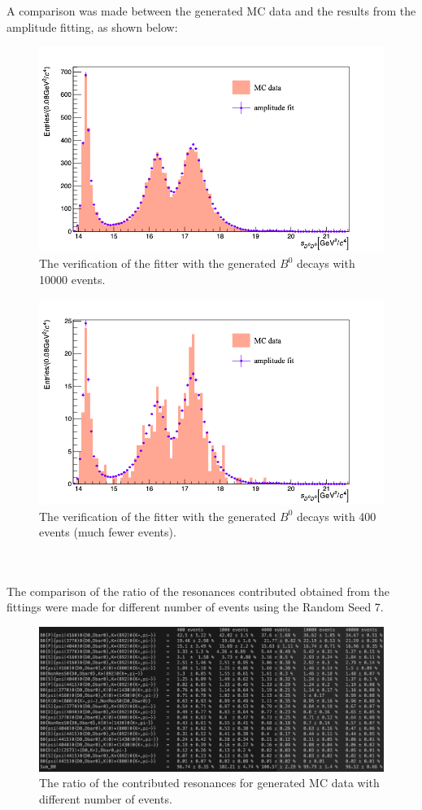 \\
\\
A comparison was made between the generated MC data and the results from the amplitude fitting, as shown  below:
\begin{figure}[h]
\center
\includegraphics*[width=0.86\linewidth]{amplitude_fit/compare}
\caption{The verification of the fitter with the generated $B^0$ decays with 10000 events.}
\label{compare_fitter}
\end{figure}
\begin{figure}[h]
\center
\includegraphics*[width=0.86\linewidth]{amplitude_fit/compare_400}
\caption{The verification of the fitter with the generated $B^0$ decays with 400 events (much fewer events).}
\label{compare_fitter_400}
\end{figure}
\\
\\
\clearpage
The comparison of the ratio of the resonances contributed obtained from the fittings were made for different number of events using the Random Seed 7.
\begin{figure}[h]
\center
\includegraphics*[width=1.06\linewidth]{amplitude_fit/compare_resonance}
\caption{The ratio of the contributed resonances for generated MC data with different number of events.}
\label{compare_resonance}
\end{figure}
